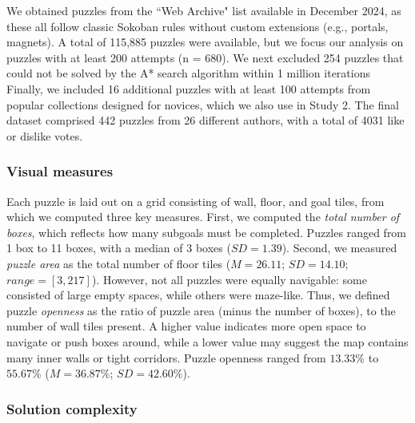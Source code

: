 \documentclass[10pt,letterpaper]{article}
\newcommand{\kz}[1]{{\color{blue}KZ: #1}}
\begin{document}
We obtained puzzles from the ``Web Archive" list available in December 2024, as these all follow classic Sokoban rules without custom extensions (e.g., portals, magnets). 
A total of 115,885 puzzles were available, but we focus our analysis on puzzles with at least 200 attempts (n = 680). %
We next excluded 254 puzzles that could not be solved by the A* search algorithm within 1 million iterations
Finally, we included 16 additional puzzles with at least 100 attempts from popular collections designed for novices, which we also use in Study 2.
The final dataset comprised 442 puzzles from 26 different authors, with a total of 4031 like or dislike votes. %

\subsubsection{Visual measures}

Each puzzle is laid out on a grid consisting of wall, floor, and goal tiles, from which we computed three key measures. First, we computed the \textit{total number of boxes}, which reflects how many subgoals must be completed. Puzzles ranged from 1 box to 11 boxes, with a median of 3 boxes ($SD = 1.39$). Second, we measured \textit{puzzle area} as the total number of floor tiles ($M = 26.11$; $SD = 14.10$; $range = [3, 217]$). However, not all puzzles were equally navigable: some consisted of large empty spaces, while others were maze-like. Thus, we defined puzzle \textit{openness} as the ratio of puzzle area (minus the number of boxes), to the number of wall tiles present. A higher value indicates more open space to navigate or push boxes around, while a lower value may suggest the map contains many inner walls or tight corridors. Puzzle openness ranged from $13.33\%$ to $55.67\%$ ($M = 36.87\%$; $SD = 42.60\%$).

\subsubsection{Solution complexity} 
\end{document}
